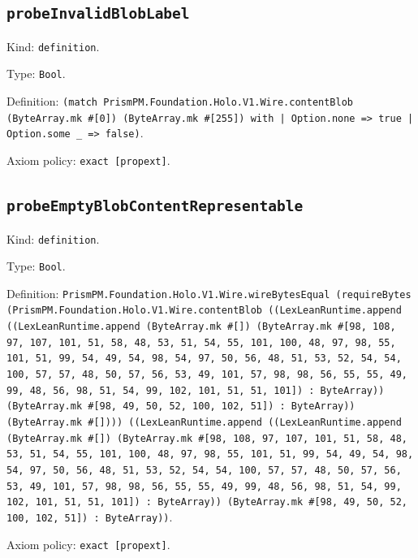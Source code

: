 \documentclass[11pt]{article}
\begin{document}
\subsection*{\texttt{probeInvalidBlobLabel}}
\noindent Kind: \texttt{definition}.\par
\noindent Type: \texttt{Bool}.\par
\noindent Definition: \texttt{(match PrismPM.Foundation.Holo.V1.Wire.contentBlob (ByteArray.mk \#[0]) (ByteArray.mk \#[255]) with | Option.none => true | Option.some \_ => false)}.\par
\noindent Axiom policy: \texttt{exact [propext]}.\par
\subsection*{\texttt{probeEmptyBlobContentRepresentable}}
\noindent Kind: \texttt{definition}.\par
\noindent Type: \texttt{Bool}.\par
\noindent Definition: \texttt{PrismPM.Foundation.Holo.V1.Wire.wireBytesEqual (requireBytes (PrismPM.Foundation.Holo.V1.Wire.contentBlob ((LexLeanRuntime.append ((LexLeanRuntime.append (ByteArray.mk \#[]) (ByteArray.mk \#[98, 108, 97, 107, 101, 51, 58, 48, 53, 51, 54, 55, 101, 100, 48, 97, 98, 55, 101, 51, 99, 54, 49, 54, 98, 54, 97, 50, 56, 48, 51, 53, 52, 54, 54, 100, 57, 57, 48, 50, 57, 56, 53, 49, 101, 57, 98, 98, 56, 55, 55, 49, 99, 48, 56, 98, 51, 54, 99, 102, 101, 51, 51, 101]) : ByteArray)) (ByteArray.mk \#[98, 49, 50, 52, 100, 102, 51]) : ByteArray)) (ByteArray.mk \#[]))) ((LexLeanRuntime.append ((LexLeanRuntime.append (ByteArray.mk \#[]) (ByteArray.mk \#[98, 108, 97, 107, 101, 51, 58, 48, 53, 51, 54, 55, 101, 100, 48, 97, 98, 55, 101, 51, 99, 54, 49, 54, 98, 54, 97, 50, 56, 48, 51, 53, 52, 54, 54, 100, 57, 57, 48, 50, 57, 56, 53, 49, 101, 57, 98, 98, 56, 55, 55, 49, 99, 48, 56, 98, 51, 54, 99, 102, 101, 51, 51, 101]) : ByteArray)) (ByteArray.mk \#[98, 49, 50, 52, 100, 102, 51]) : ByteArray))}.\par
\noindent Axiom policy: \texttt{exact [propext]}.\par
\end{document}
